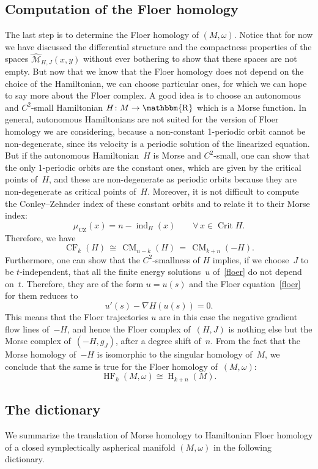 \documentclass[12pt,twoside]{amsart}
\theoremstyle{plain}
\numberwithin{figure}{section}
\numberwithin{equation}{section}
\def\ind{\operatorname{ind}}
\def\Crit{\operatorname{Crit}}
\def\H{\operatorname{H}}
\def\sCZ{ {\scriptscriptstyle\operatorname{CZ}}}
\def\CM{\operatorname{CM}}
\def\CF{\operatorname{CF}}
\def\HF{\operatorname{HF}}
\def\R{\operatorname{\mathbbm{R}}}
\begin{document}
\subsection{Computation of the Floer homology} \label{s:comp}
The last step is to determine the Floer homology of $(M,\omega)$. Notice that for now we have discussed 
the differential structure and the compactness properties of the spaces 
$\widehat{\mathcal{M}}_{H,J}(x,y)$ without 
ever bothering to show that these spaces are not empty. But now that we know that the Floer homology 
does not depend on the choice of the Hamiltonian, we can choose particular ones, for which we can hope 
to say more about the Floer complex. A good idea is to choose an autonomous and $C^2$-small 
Hamiltonian $H \colon M \rightarrow \R$ which is a Morse function. In general, autonomous Hamiltonians are not suited for the version of Floer homology we are considering, because a non-constant 1-periodic orbit cannot be non-degenerate, since its velocity is a periodic solution of the linearized equation. 
But if the autonomous Hamiltonian~$H$ is Morse and $C^2$-small, one can show that the only 1-periodic orbits are the constant ones, which are given by the critical points of~$H$, and these are non-degenerate as periodic orbits because they are non-degenerate as critical points of~$H$. 
Moreover, it is not difficult to compute the Conley--Zehnder index of these constant orbits and to relate 
it to their Morse index:
\[
\mu_{\sCZ}(x) = n-\ind_H(x) \qquad \forall \, x \in \Crit H.
\]
Therefore, we have
\[
\CF_k(H) \,\cong\, \CM_{n-k}(H) \,=\, \CM_{k+n}(-H).
\]
Furthermore, one can show that the $C^2$-smallness of $H$ implies, if we choose~$J$ to be 
$t$-independent, that all the finite energy solutions~$u$ of~\eqref{floer} do not depend on~$t$. 
Therefore, they are of the form $u=u(s)$ and the Floer equation~\eqref{floer} for them reduces to
\[
u'(s) - \nabla H(u(s)) = 0.
\]
This means that the Floer trajectories $u$ are in this case the negative gradient flow lines of~$-H$, 
and hence the Floer complex of~$(H,J)$ is nothing else but the Morse complex of~$(-H,g_J)$, 
after a degree shift of~$n$. From the fact that the Morse homology of~$-H$ is isomorphic to the singular homology of~$M$, we conclude that the same is true for the Floer homology of~$(M,\omega)$:
\begin{equation} \label{iso:HF}
\HF_k(M,\omega) \cong \H_{k+n}(M).
\end{equation}

\subsection{The dictionary}
We summarize the translation of Morse homology to Hamiltonian Floer homology of a closed 
symplectically aspherical manifold $(M,\omega)$ in the following dictionary.
\end{document}
